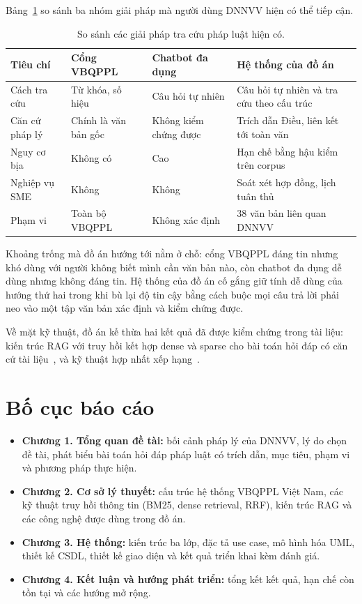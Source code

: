 \documentclass[12pt,a4paper]{report}
\numberwithin{equation}{chapter}
\numberwithin{figure}{chapter}
\numberwithin{table}{chapter}
\newcommand{\soLuat}{38}
\begin{document}
Bảng~\ref{tab:khao-sat} so sánh ba nhóm giải pháp mà người dùng DNNVV hiện có thể
tiếp cận.

\begin{table}[htp]
    \centering
    \caption{So sánh các giải pháp tra cứu pháp luật hiện có.}
    \label{tab:khao-sat}
    \begin{tabular}{p{3.1cm}p{3.5cm}p{3.5cm}p{3.5cm}}
        \toprule
        \textbf{Tiêu chí} & \textbf{Cổng VBQPPL} & \textbf{Chatbot đa dụng} &
        \textbf{Hệ thống của đồ án} \\
        \midrule
        Cách tra cứu & Từ khóa, số hiệu & Câu hỏi tự nhiên & Câu hỏi tự nhiên
        và tra cứu theo cấu trúc \\
        Căn cứ pháp lý & Chính là văn bản gốc & Không kiểm chứng được & Trích dẫn
        Điều, liên kết tới toàn văn \\
        Nguy cơ bịa & Không có & Cao & Hạn chế bằng hậu kiểm trên corpus \\
        Nghiệp vụ SME & Không & Không & Soát xét hợp đồng, lịch tuân thủ \\
        Phạm vi & Toàn bộ VBQPPL & Không xác định & \soLuat{} văn bản liên quan
        DNNVV \\
        \bottomrule
    \end{tabular}
\end{table}

Khoảng trống mà đồ án hướng tới nằm ở chỗ: cổng VBQPPL đáng tin nhưng khó dùng
với người không biết mình cần văn bản nào, còn chatbot đa dụng dễ dùng nhưng
không đáng tin. Hệ thống của đồ án cố gắng giữ tính dễ dùng của hướng thứ hai
trong khi bù lại độ tin cậy bằng cách buộc mọi câu trả lời phải neo vào một tập
văn bản xác định và kiểm chứng được.

Về mặt kỹ thuật, đồ án kế thừa hai kết quả đã được kiểm chứng trong tài liệu:
kiến trúc RAG với truy hồi kết hợp dense và sparse cho bài toán hỏi đáp có căn cứ
tài liệu~\cite{lewis2020rag, karpukhin2020dpr}, và kỹ thuật hợp nhất xếp
hạng~\cite{cormack2009rrf}.

\section{Bố cục báo cáo}

\begin{itemize}
    \item \textbf{Chương 1. Tổng quan đề tài:} bối cảnh pháp lý của DNNVV, lý do
    chọn đề tài, phát biểu bài toán hỏi đáp pháp luật có trích dẫn, mục tiêu,
    phạm vi và phương pháp thực hiện.
    \item \textbf{Chương 2. Cơ sở lý thuyết:} cấu trúc hệ thống VBQPPL Việt Nam,
    các kỹ thuật truy hồi thông tin (BM25, dense retrieval, RRF), kiến trúc RAG
    và các công nghệ được dùng trong đồ án.
    \item \textbf{Chương 3. Hệ thống:} kiến trúc ba lớp, đặc tả use case, mô hình
    hóa UML, thiết kế CSDL, thiết kế giao diện và kết quả triển khai kèm đánh giá.
    \item \textbf{Chương 4. Kết luận và hướng phát triển:} tổng kết kết quả, hạn
    chế còn tồn tại và các hướng mở rộng.
\end{itemize}
\end{document}
